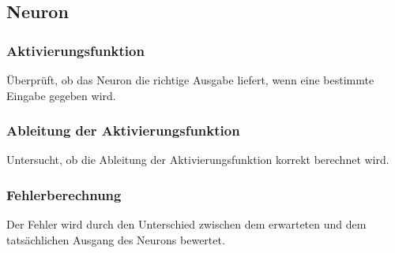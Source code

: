 \subsection{Neuron}
\label{sec:DesignNeuron}
\subsubsection{Aktivierungsfunktion}
\label{sec:DesignAktivierungsfunktion}
Überprüft, ob das Neuron die richtige Ausgabe liefert, wenn eine bestimmte Eingabe gegeben wird.
\subsubsection{Ableitung der Aktivierungsfunktion}
\label{sec:DesignAbleitungDerAktivierungsfunktion}
Untersucht, ob die Ableitung der Aktivierungsfunktion korrekt berechnet wird.
\subsubsection{Fehlerberechnung  }
\label{sec:DesignFehlerberechnung}
Der Fehler wird durch den Unterschied zwischen dem erwarteten und dem tatsächlichen Ausgang des Neurons bewertet.